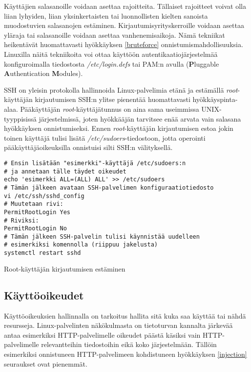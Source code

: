 Käyttäjien salasanoille voidaan asettaa rajoitteita. Tällaiset rajoitteet voivat olla liian lyhyiden, liian yksinkertaisten tai luonnollisten kielten sanoista muodostuvien salasanojen estäminen. Kirjautumisyrityskerroille voidaan asettaa yläraja tai salasanoille voidaan asettaa vanhenemisaikoja. Nämä tekniikat heikentävät huomattavasti hyökkäyksen \ref{bruteforce} onnistumismahdollisuuksia. Linuxilla näitä tekniikoita voi ottaa käyttöön autentikaatiojärjestelmää konfiguroimalla tiedostosta \textit{/etc/login.defs} tai PAM:n avulla (\textbf{P}luggable \textbf{A}uthentication \textbf{M}odules).~\cite{kemp2009linux}

SSH on yleisin protokolla hallinnoida Linux-palvelimia etänä ja estämällä \textit{root}-käyttäjän kirjautumisen SSH:n ylitse pienentää huomattavasti hyökkäyspinta-alaa. Pääkäyttäjän \textit{root}-käyttäjätunnus on aina sama useimmissa UNIX-tyyppisissä järjestelmissä, joten hyökkääjän tarvitsee enää arvata vain salasana hyökkäyksen onnistumiseksi. Ennen \textit{root}-käyttäjän kirjautumisen estoa jokin toinen käyttäjä tulisi lisätä \textit{/etc/sudoers}-tiedostoon, jotta operointi pääkäyttäjäoikeuksilla onnistuisi silti SSH:n välityksellä.~\cite{sshd}~\cite{sudo}

\begin{algorithm}[tbh]
\begin{verbatim}
# Ensin lisätään "esimerkki"-käyttäjä /etc/sudoers:n
# ja annetaan tälle täydet oikeudet
echo 'esimerkki ALL=(ALL) ALL' >> /etc/sudoers
# Tämän jälkeen avataan SSH-palvelimen konfiguraatiotiedosto
vi /etc/ssh/sshd_config
# Muutetaan rivi:
PermitRootLogin Yes
# Riviksi:
PermitRootLogin No
# Tämän jälkeen SSH-palvelin tulisi käynnistää uudelleen
# esimerkiksi komennolla (riippuu jakelusta)
systemctl restart sshd
\end{verbatim}
\caption{Root-käyttäjän kirjautumisen estäminen\label{alg:disable_root_login}}
\end{algorithm}
\newpage{}

\subsection{Käyttöoikeudet}\label{access_rights}
Käyttöoikeuksien hallinnalla on tarkoitus hallita sitä kuka saa käyttää tai nähdä resursseja. Linux-palvelinten näkökulmasta on tietoturvan kannalta järkevää antaa esimerkiksi HTTP-palvelimelle oikeudet päästä käsiksi vain HTTP-palvelimelle relevantteihin tiedostoihin eikä koko järjestelmään. Tällöin esimerkiksi onnistuneen HTTP-palvelimeen kohdistuneen hyökkäyksen \ref{injection} seuraukset ovat pienemmät.

